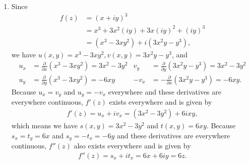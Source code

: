 \documentclass[a4paper,12pt]{article}
\begin{document}
\begin{enumerate}
\begin{enumerate}
            \item
                Since
                \begin{align*}
                    f(z) &= (x + iy)^3 \\
                    &= x^3 + 3x^2(iy) + 3x(iy)^2 + (iy)^3 \\
                    &= (x^3 - 3xy^2) + i(3x^2y - y^3),
                \end{align*}
                we have $u(x, y) = x^3 - 3xy^2, v(x, y) = 3x^2y - y^3$, and
                \begin{align*}
                    u_x &= \frac{\partial}{\partial x}(x^3 - 3xy^2) = 3x^2 - 3y^2 &
                    v_y &= \frac{\partial}{\partial y}(3x^2y - y^3) = 3x^2 - 3y^2 \\
                    u_y &= \frac{\partial}{\partial y}(x^3 - 3xy^2) = -6xy &
                    -v_x &= -\frac{\partial}{\partial x}(3x^2y - y^3) = -6xy.
                \end{align*}
                Because $u_x = v_y$ and $u_y = -v_x$ everywhere and these derivatives are everywhere continuous, $f'(z)$ exists everywhere and is given by
                \begin{align*}
                    f'(z) = u_x + iv_x = (3x^2 - 3y^2) + 6ixy,
                \end{align*}
                which means we have $s(x, y) = 3x^2 - 3y^2$ and $t(x, y) = 6xy$. Because $s_x = t_y = 6x$ and $s_y = -t_x = -6y$ and these derivatives are everywhere continuous, $f''(z)$ also exists everywhere and is given by
                \begin{align*}
                    f''(z) = s_x + it_x = 6x + 6iy = 6z.
                \end{align*}


\end{enumerate}
\end{enumerate}
\end{document}

